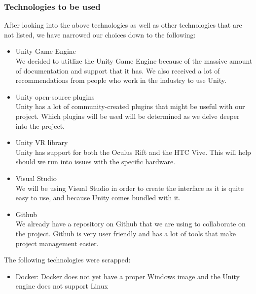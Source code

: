 	\subsubsection{Technologies to be used}
		After looking into the above technologies as well as other technologies that are not listed, we have narrowed our choices down to the following:
		\begin{itemize}
			\item Unity Game Engine \\
			We decided to utitlize the Unity Game Engine because of the massive amount of documentation and support that it has. We also received a lot of recommendations from people who work in the industry to use Unity.\\

			\item Unity open-source plugins \\
			Unity has a lot of community-created plugins that might be useful with our project. Which plugins will be used will be determined as we delve deeper into the project. \\

			\item Unity VR library \\
			Unity has support for both the Oculus Rift and the HTC Vive. This will help should we run into issues with the specific hardware. \\

			\item Visual Studio \\
			We will be using Visual Studio in order to create the interface as it is quite easy to use, and because Unity comes bundled with it. \\

			\item Github \\
			We already have a repository on Github that we are using to collaborate on the project. Github is very user friendly and has a lot of tools that make project management easier.
		\end{itemize}

	The following technologies were scrapped:
	\begin{itemize}
		\item Docker: Docker does not yet have a proper Windows image and the Unity engine does not support Linux
	\end{itemize}
